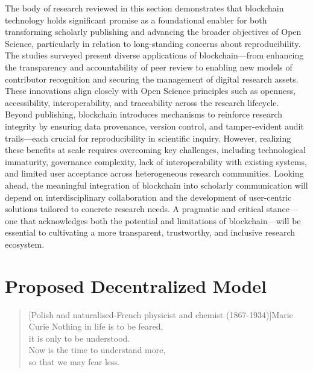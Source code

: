\documentclass[final]{rc-book-2.14}
\begin{document}
The body of research reviewed in this section demonstrates that blockchain technology holds significant promise as a foundational enabler for both transforming scholarly publishing and advancing the broader objectives of Open Science, particularly in relation to long-standing concerns about reproducibility. The studies surveyed present diverse applications of blockchain—from enhancing the transparency and accountability of peer review to enabling new models of contributor recognition and securing the management of digital research assets. These innovations align closely with Open Science principles such as openness, accessibility, interoperability, and traceability across the research lifecycle. Beyond publishing, blockchain introduces mechanisms to reinforce research integrity by ensuring data provenance, version control, and tamper-evident audit trails—each crucial for reproducibility in scientific inquiry. However, realizing these benefits at scale requires overcoming key challenges, including technological immaturity, governance complexity, lack of interoperability with existing systems, and limited user acceptance across heterogeneous research communities. Looking ahead, the meaningful integration of blockchain into scholarly communication will depend on interdisciplinary collaboration and the development of user-centric solutions tailored to concrete research needs. A pragmatic and critical stance—one that acknowledges both the potential and limitations of blockchain—will be essential to cultivating a more transparent, trustworthy, and inclusive research ecosystem.

\chapter{Proposed Decentralized Model}
\label{chp:proposed_model}

\begin{quotation}[Polish and naturalised-French physicist and chemist (1867-1934)]{Marie Curie}
    Nothing in life is to be feared, \\
    it is only to be understood. \\
    Now is the time to understand more, \\
    so that we may fear less.
\end{quotation}
\end{document}
